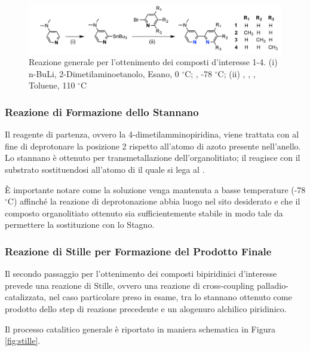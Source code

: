 \documentclass[a4paper, 12pt]{article}
\begin{document}
\begin{figure}[H]
	\centering
	\includegraphics[width=\linewidth]{immagini/rea_g.png}
	\caption{Reazione generale per l'ottenimento dei composti d'interesse 1-4. (i) n-BuLi, 2-Dimetilaminoetanolo, Esano, 0 $^\circ$C; , -78 $^\circ$C; (ii) , , , Toluene, 110 $^\circ$C }
	\label{fig:rea_g}
\end{figure}

\subsubsection{Reazione di Formazione dello Stannano }
Il reagente di partenza, ovvero la 4-dimetilamminopiridina, viene trattata con  al fine di deprotonare la posizione 2 rispetto all'atomo di azoto presente nell'anello. Lo stannano è ottenuto per transmetallazione dell'organolitiato; il  reagisce con il substrato sostituendosi all'atomo di  il quale si lega al .

È importante notare come la soluzione venga mantenuta a basse temperature (-78 $^\circ$C) affinché la reazione di deprotonazione abbia luogo nel sito desiderato e che il composto organolitiato ottenuto sia sufficientemente stabile in modo tale da permettere la sostituzione con lo Stagno.

\subsubsection{Reazione di Stille per Formazione del Prodotto Finale}
Il secondo passaggio per l'ottenimento dei composti bipiridinici d'interesse prevede una reazione di Stille, ovvero una reazione di cross-coupling palladio-catalizzata, nel caso particolare preso in esame, tra lo stannano ottenuto come prodotto dello step di reazione precedente e un alogenuro alchilico piridinico.\cite{clayden_organic_2012}

Il processo catalitico generale è riportato in maniera schematica in Figura \ref{fig:stille}.
\end{document}
